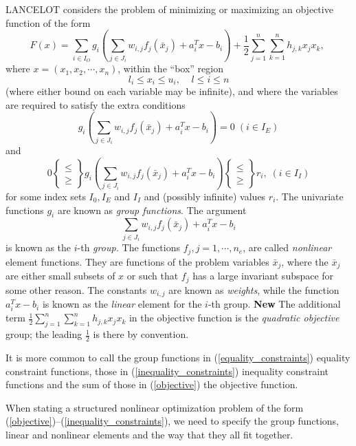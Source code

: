 \documentclass[a4paper]{article}
\newcommand{\beqn}[1]{\begin{equation}\label{#1}}
\newcommand{\eeqn}{\end{equation}}
\newcommand{\req}[1]{(\ref{#1})}
\newcommand{\ms}{\;\;\;\;}
\newcommand{\sfrac}[2]{{\scriptstyle \frac{#1}{#2}}}
\newcommand{\half}{\sfrac{1}{2}}
\begin{document}
{\sf LANCELOT} considers the problem of minimizing or maximizing
an objective function
of the form
\beqn{objective}
F( x )
= \sum_{i \in I_O}g_i \left (
\sum_{j \in J_i} w_{i,j} f_j (\bar{x}_j) +  a_i^T x  - b_i  \right)
+ \half \sum_{j=1}^n \sum_{k=1}^n h_{j,k} x_j x_k ,
\;
\eeqn
where $x = (x_1, x_2,\cdots, x_n)$, within the ``box'' region
\beqn{box}
l_i \leq x_i \leq u_i, \ms l \leq i \leq n
\eeqn
(where either bound on each variable may be  infinite),  and where the
variables are required to satisfy the extra conditions
\beqn{equality_constraints}
g_i \left(
\sum_{j \in J_{i}} w_{i,j}f_j (\bar{x}_j) + a_i^T x - b_i  \right) = 0
\; (i \in I_E)
\eeqn
and
\beqn{inequality_constraints}
0 \left \{ \begin{array}{ll}
           \leq \\ \geq
           \end{array} \right\}
g_i \left(
\sum_{j \in J_{i}} w_{i,j} f_j(\bar{x}_j) + a_i^T x - b_i \right)
\left\{ \begin{array}{ll}
\leq \\ \geq
\end{array} \right\}
 r_i,
\; (i \in I_I)
\eeqn
for some index  sets  $I_0, I_E$  and $I_I$   and  (possibly infinite)
values $r_i$.  The univariate functions $g_i$ are known as  {\em group
functions}.
The argument
\[ \sum_{j \in J_i} w_{i,j} f_j(\bar{x}_j) + a_i^T x - b_i \]
is known as  the  $i$-th {\em  group.}
The functions $f_j, j=1,\cdots,
n_e$, are  called   {\em  nonlinear} element functions.
 They are  functions of the  problem  variables
$\bar{x}_j$, where  the
$\bar{x}_j$ are either small subsets of  $x$ or such  that $f_j$ has a
large invariant   subspace
for  some other  reason.  The  constants  $w_{i,j}$ are  known as {\em
weights}, while
the function $a_i^T  x -  b_i$  is known  as the {\em linear}
element for the $i$-th group.
{\bf New}
The additional term $\half \sum_{j=1}^n \sum_{k=1}^n h_{j,k} x_j x_k$
in the objective function is the {\em quadratic objective} group; the
leading $\half$ is there by convention.

It    is    more  common    to     call   the   group    functions
in \req{equality_constraints}  equality  constraint functions,
those   in
\req{inequality_constraints} inequality constraint functions
and the sum of those
in \req{objective} the objective function.

When   stating a  structured  nonlinear optimization  problem    of  the  form
\req{objective}--\req{inequality_constraints}, we  need to  specify  the group
functions,
linear and nonlinear elements
and the way that they all fit together.
\end{document}

